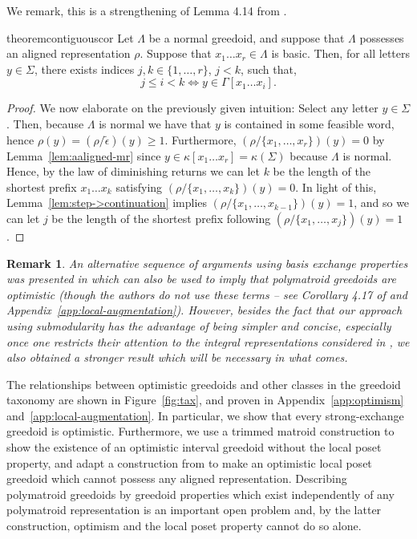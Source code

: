 \documentclass[11pt]{article}
\newtheorem{remark}[theorem]{Remark}
\newcommand{\univ}{\Sigma}
\newcommand{\glang}{\Lambda}
\begin{document}
We remark, this is a strengthening of Lemma 4.14 from \cite{korte1985polymatroid}.
\begin{restatable}{theorem}{contiguouscor}\label{thm:contiguous}
    Let $\glang$ be a normal greedoid, and suppose that $\glang$ possesses an aligned representation $\rho$.
    Suppose that $x_1\ldots x_r \in \glang$ is basic.
    Then, for all letters $y\in\univ$, there exists indices $j,k\in\{1,\ldots, r\}$, $j < k$, such that,
    \[
        j \leq i < k \iff y \in \Gamma[x_1\ldots x_i].
    \]
\end{restatable}
\begin{proof}
    We now elaborate on the previously given intuition:
    Select any letter $y \in \univ$.
    Then, because $\glang$ is normal we have that $y$ is contained in some feasible word, hence $\rho(y) = (\rho/\widetilde{\epsilon})(y) \geq 1$.
    Furthermore, $(\rho/\{x_1, \ldots, x_r\})(y) = 0$ by Lemma~\ref{lem:aaligned-mr} since $y \in \kappa[x_1\ldots x_r] = \kappa(\univ)$ because $\glang$ is normal.
    Hence, by the law of diminishing returns we can let $k$ be the length of the shortest prefix $x_1\ldots x_k$ satisfying $(\rho/\{x_1,\ldots, x_k\})(y) = 0$.
    In light of this, Lemma~\ref{lem:step->continuation} implies $(\rho/\{x_1,\ldots, x_{k-1}\})(y) = 1$, and so we can let $j$ be the length of the shortest prefix following $(\rho/\{x_1,\ldots,x_j\})(y) = 1$.
\end{proof}
\begin{remark}\label{rem:strong-optimism}
    An alternative sequence of arguments using basis exchange properties was presented in \cite{korte1985polymatroid} which can also be used to imply that polymatroid greedoids are optimistic (though the authors do not use these terms -- see Corollary 4.17 of \cite{korte1985polymatroid} and Appendix~\ref{app:local-augmentation}).
    However, besides the fact that our approach using submodularity has the advantage of being simpler and concise, especially once one restricts their attention to the integral representations considered in \cite{korte1985polymatroid}, we also obtained a stronger result which will be necessary in what comes.
\end{remark}
\fi

The relationships between optimistic greedoids and other classes in the greedoid taxonomy are shown in Figure~\ref{fig:tax}, and proven in Appendix~\ref{app:optimism} and~\ref{app:local-augmentation}.
In particular, we show that every strong-exchange greedoid is optimistic.
Furthermore, we use a trimmed matroid construction to show the existence of an optimistic interval greedoid without the local poset property, and adapt a construction from \cite{korte1988intersection} to make an optimistic local poset greedoid which cannot possess any aligned representation.
Describing polymatroid greedoids by greedoid properties which exist independently of any polymatroid representation is an important open problem and, by the latter construction, optimism and the local poset property cannot do so alone.
\end{document}
